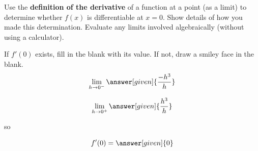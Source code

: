 \documentclass[handout]{ximera}
\begin{document}
\begin{problem}
Use the \textbf{definition of the derivative} of a function at a point (as a limit) to determine whether $f(x)$ is differentiable at $x=0$. Show details of how you made this determination. Evaluate any limits involved algebraically (without using a calculator).

If $f'(0)$ exists, fill in the blank with its value. If not, draw a smiley face in the blank. 
\[
\displaystyle \lim_{h\to 0^-} \answer[given]{\dfrac{-h^3}{h}}
\]

\[
\displaystyle \lim_{h\to 0^+} \answer[given]{\dfrac{h^3}{h}}
\]

so

\[
f'(0) = \answer[given]{0}
\]
\end{problem}

%
%

%
\end{document}
